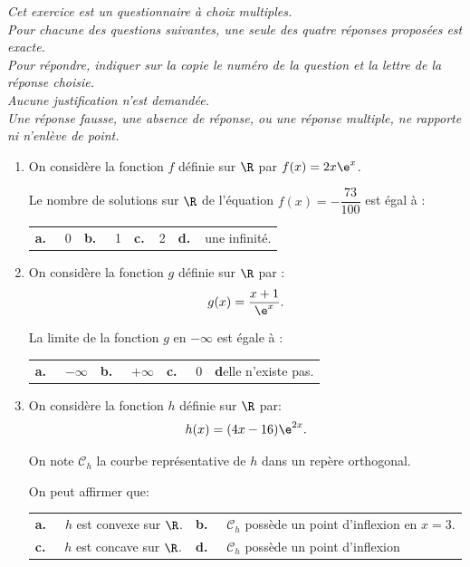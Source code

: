 \medskip

\emph{Cet exercice est un questionnaire à choix multiples.\\Pour chacune des questions suivantes, une seule des quatre réponses proposées est exacte.\\Pour répondre, indiquer sur la copie le numéro de la question et la lettre de la réponse choisie.\\Aucune justification n'est demandée.\\Une réponse fausse, une absence de réponse, ou une réponse multiple, ne rapporte
ni n'enlève de point.}

\medskip

\begin{enumerate}
\item On considère la fonction $f$ définie sur $\R$ par $f(x) = 2x\e^x$.

Le nombre de solutions sur $\R$ de l'équation $f(x) = - \dfrac{73}{100}$ est égal à :

\begin{center}
\begin{tabularx}{\linewidth}{*{4}{X}}
\textbf{a.~~} 0 &\textbf{b.~~} 1 &\textbf{c.~~}2&\textbf{d.~~}une infinité.
\end{tabularx}
\end{center}

\item On considère la fonction $g$ définie sur $\R$ par :
\[g(x) = \dfrac{x+ 1}{\e^x}.\]

La limite de la fonction $g$ en $- \infty$ est égale à : 

\begin{center}
\begin{tabularx}{\linewidth}{*{4}{X}}
\textbf{a.~~} $-\infty$&\textbf{b.~~} $+\infty$ &\textbf{c.~~} 0&\textbf{d}elle n'existe pas.
\end{tabularx}
\end{center}

\item On considère la fonction $h$ définie sur $\R$ par:
\[h(x) = (4x - 16)\e^{2x}.\]

On note $\mathcal{C}_h$ la courbe représentative de $h$ dans un repère orthogonal.

On peut affirmer que:

\begin{center}
\begin{tabularx}{\linewidth}{*{2}{X}}
\textbf{a.~~} $h$ est convexe sur $\R$.&\textbf{b.~~} $\mathcal{C}_h$ possède un point d'inflexion en $x = 3$.\\
\textbf{c.~~} $h$ est concave sur $\R$.&\textbf{d.~~} $\mathcal{C}_h$ possède un point d'inflexion 


\end{tabularx}
\end{center}
\end{enumerate}
